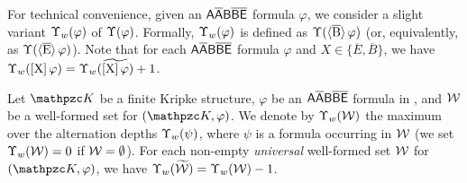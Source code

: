 For technical convenience, given an $\mathsf{A\overline{A}B\overline{B}\overline{E}}$ formula $\varphi$, we consider a slight variant $\Upsilon_w(\varphi)$ of $\Upsilon(\varphi)$. Formally, $\Upsilon_w(\varphi)$ is defined as $\Upsilon(\operatorname{\langle \overline{B}\rangle}\varphi)$ (or, equivalently, as $\Upsilon(\operatorname{\langle \overline{E}\rangle}\varphi)$).
Note that for each
$\mathsf{A\overline{A}B\overline{B}\overline{E}}$ formula $\varphi$ and $X\in \{\overline{E},\overline{B}\}$, we have $\Upsilon_w(\operatorname{\mathopen[ X \mathclose]}\varphi)=\Upsilon_w(\widetilde{\operatorname{\mathopen[ X \mathclose]}\varphi})+1$.

Let $\Ku$ be a finite Kripke structure,  $\varphi$
be an $\mathsf{A\overline{A}B\overline{B}\overline{E}}$ formula in \nnf, and ${\mathcal{W}}$ be a well-formed set for $(\Ku,\varphi)$.
We denote by $\Upsilon_w({\mathcal{W}})$ the maximum over the  alternation depths $\Upsilon_w(\psi)$, where $\psi$ is a formula occurring in ${\mathcal{W}}$
(we set $\Upsilon_w({\mathcal{W}})=0$ if ${\mathcal{W}}=\emptyset$).
For each non-empty \emph{universal} well-formed set ${\mathcal{W}}$ for $(\Ku,\varphi)$, we have $\Upsilon_w(\widetilde{{\mathcal{W}}})= \Upsilon_w({\mathcal{W}})- 1$.

